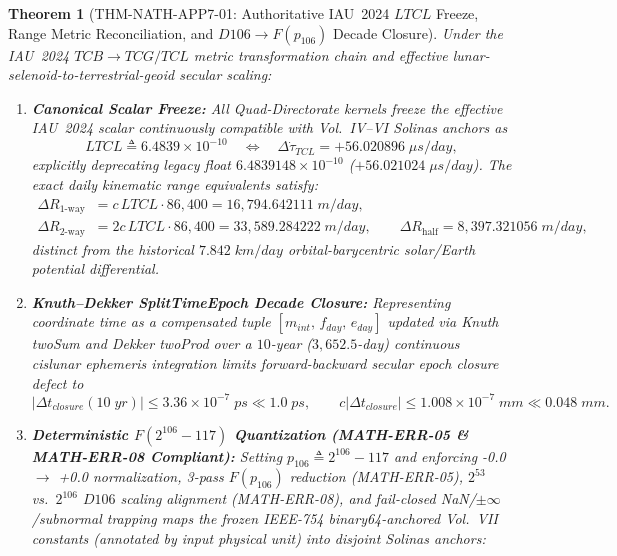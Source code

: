 \documentclass[11pt,a4paper,reqno]{article}
\def\texttt#1{#1}%
\def\mathrm#1{#1}%
\def\mathbb#1{#1}%
\def\F#1{F(#1)}%
\def\Done{D106}%
\def\LTCL{LTCL}%
\theoremstyle{plain}
\newtheorem{theorem}{Theorem}[section]
\theoremstyle{definition}
\theoremstyle{remark}
\numberwithin{equation}{section}
\numberwithin{table}{section}
\newcommand{\F}[1]{\mathbb{F}_{#1}}
\newcommand{\Done}{\mathbb{D}_{106}}
\newcommand{\LTCL}{L_{\mathrm{TCL}}}
\begin{document}
\begin{theorem}[{\texttt{THM-NATH-APP7-01}: Authoritative IAU~2024 $\LTCL$ Freeze, Range Metric Reconciliation, and $\Done \to \F{p_{106}}$ Decade Closure}]
\label{thm:nath_ltcl}
Under the IAU~2024 $\mathrm{TCB} \to \mathrm{TCG}/\mathrm{TCL}$ metric transformation chain \cite{IAU2024ResII,AshbyPatla2024} and effective lunar-selenoid-to-terrestrial-geoid secular scaling:
\begin{enumerate}[label=(\roman*)]
  \item \textbf{Canonical Scalar Freeze:} All Quad-Directorate kernels freeze the effective IAU~2024 scalar continuously compatible with Vol.~IV--VI Solinas anchors as
  \begin{equation}
    \LTCL \triangleq 6.4839 \times 10^{-10} \quad\Longleftrightarrow\quad
    \Delta\dot{\tau}_{\mathrm{TCL}} = +56.020896\;\mu\mathrm{s/day},
    \label{eq:ltcl_freeze}
  \end{equation}
  explicitly deprecating legacy float $6.4839148 \times 10^{-10}$ ($+56.021024\;\mu\mathrm{s/day}$). The exact daily kinematic range equivalents satisfy:
  \begin{align}
    \Delta R_{1\text{-way}} &= c\,\LTCL \cdot 86{,}400 = 16{,}794.642111\;\mathrm{m/day}, \\
    \Delta R_{2\text{-way}} &= 2c\,\LTCL \cdot 86{,}400 = 33{,}589.284222\;\mathrm{m/day}, \qquad
    \Delta R_{\text{half}} = 8{,}397.321056\;\mathrm{m/day},
  \end{align}
  distinct from the historical $7.842\;\mathrm{km/day}$ orbital-barycentric solar/Earth potential differential.
  \item \textbf{Knuth--Dekker \textnormal{\ttfamily SplitTimeEpoch} Decade Closure:} Representing coordinate time as a compensated tuple $[m_{\mathrm{int}},\, f_{\mathrm{day}},\, e_{\mathrm{day}}]$ updated via Knuth \texttt{twoSum} and Dekker \texttt{twoProd} \cite{Dekker1971,Knuth1997TAOCP2} over a $10$-year ($3{,}652.5$-day) continuous cislunar ephemeris integration limits forward-backward secular epoch closure defect to
  \begin{equation}
    |\Delta t_{\mathrm{closure}}(10\;\mathrm{yr})| \le 3.36 \times 10^{-7}\;\mathrm{ps} \ll 1.0\;\mathrm{ps},
    \qquad
    c|\Delta t_{\mathrm{closure}}| \le 1.008 \times 10^{-7}\;\mathrm{mm} \ll 0.048\;\mathrm{mm}.
  \end{equation}
  \item \textbf{Deterministic $\F{2^{106}-117}$ Quantization (\textnormal{\ttfamily MATH-ERR-05} \& \textnormal{\ttfamily MATH-ERR-08} Compliant):} Setting $p_{106} \triangleq 2^{106} - 117$ and enforcing \texttt{-0.0} $\to$ \texttt{+0.0} normalization, 3-pass $\F{p_{106}}$ reduction (\texttt{MATH-ERR-05}), $2^{53}$ vs.\ $2^{106}$ $\Done$ scaling alignment (\texttt{MATH-ERR-08}), and fail-closed \texttt{NaN}/$\pm\infty$/subnormal trapping maps the frozen IEEE-754 \texttt{binary64}-anchored Vol.~VII constants (annotated by input physical unit) into disjoint Solinas anchors:

\end{enumerate}
\end{theorem}
\end{document}
